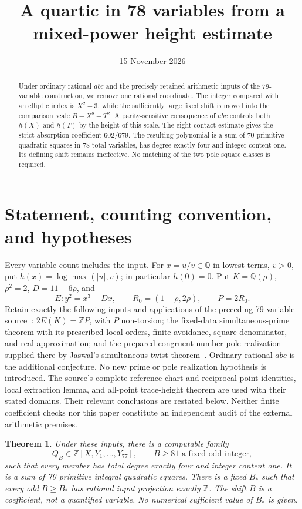 \documentclass[11pt,a4paper]{article}
\title{A quartic in 78 variables from a mixed-power height estimate}
\author{}\date{15 November 2026}
\newtheorem{theorem}{Theorem}[section]
\theoremstyle{remark}\newtheorem{remark}[theorem]{Remark}
\newcommand{\Q}{\mathbb Q}\newcommand{\Z}{\mathbb Z}
\begin{document}
\maketitle
\begin{abstract}
Under ordinary rational $abc$ and the precisely retained arithmetic
inputs of the 79-variable construction, we remove one rational coordinate.
The integer compared with an elliptic index is $X^2+3$, while the sufficiently
large fixed shift is moved into the comparison scale $B+X^8+T^2$.
A parity-sensitive consequence of $abc$ controls both $h(X)$ and $h(T)$
by the height of this scale. The eight-contact estimate gives the strict
absorption coefficient $602/679$. The resulting polynomial is a sum of
70 primitive quadratic squares in 78 total variables, has degree exactly
four and integer content one. Its defining shift remains ineffective.
No matching of the two pole square classes is required.
\end{abstract}

\section{Statement, counting convention, and hypotheses}
Every variable count includes the input. For $x=u/v\in\Q$ in lowest terms,
$v>0$, put $h(x)=\log\max(|u|,v)$; in particular $h(0)=0$.
Put $K=\Q(\rho)$, $\rho^2=2$, $D=11-6\rho$, and
\[
 E:y^2=x^3-Dx,\qquad R_0=(1+\rho,2\rho),\qquad P=2R_0.
\]
Retain exactly the following inputs and applications of the preceding
79-variable source~\cite{Parent}: $2E(K)=\Z P$, with $P$ non-torsion;
the fixed-data simultaneous-prime theorem with its prescribed local
orders, finite avoidance, square denominator, and real approximation;
and the prepared congruent-number pole realization supplied there by
Jaswal's simultaneous-twist theorem~\cite{Jaswal,Pole}.
Ordinary rational $abc$ is the additional conjecture. No new prime or
pole realization hypothesis is introduced. The source's complete
reference-chart and reciprocal-point identities, local extraction
lemma, and all-point trace-height theorem are used with their stated
domains. Their relevant conclusions are restated below. Neither finite
coefficient checks nor this paper constitute an independent audit of the
external arithmetic premises.

\begin{theorem}\label{thm:main}
Under these inputs, there is a computable family
\[
 Q_B\in\Z[X,Y_1,\ldots,Y_{77}],\qquad B\ge81\text{ a fixed odd integer},
\]
such that every member has total degree exactly four and integer content
one. It is a sum of 70 primitive integral quadratic squares. There is a
fixed $B_*$ such that every odd $B\ge B_*$ has rational input projection
exactly $\Z$. The shift $B$ is a coefficient, not a quantified variable.
No numerical sufficient value of $B_*$ is given.
\end{theorem}
\end{document}
